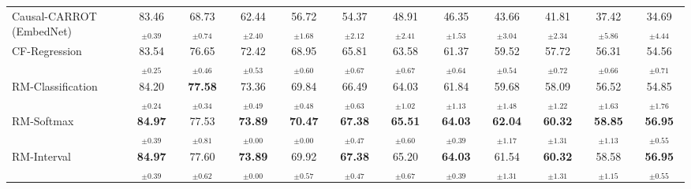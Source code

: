 \documentclass{article}
\theoremstyle{remark}
\begin{document}
\begin{table}[H]
{\begin{tabular}{lccccccccccc}
Causal-CARROT (EmbedNet) & 83.46$_{\pm0.39}$ & 68.73$_{\pm0.74}$ & 62.44$_{\pm2.40}$ & 56.72$_{\pm1.68}$ & 54.37$_{\pm2.12}$ & 48.91$_{\pm2.41}$ & 46.35$_{\pm1.53}$ & 43.66$_{\pm3.04}$ & 41.81$_{\pm2.34}$ & 37.42$_{\pm5.86}$ & 34.69$_{\pm4.44}$ \\
CF-Regression & 83.54$_{\pm0.25}$ & 76.65$_{\pm0.46}$ & 72.42$_{\pm0.53}$ & 68.95$_{\pm0.60}$ & 65.81$_{\pm0.67}$ & 63.58$_{\pm0.67}$ & 61.37$_{\pm0.64}$ & 59.52$_{\pm0.54}$ & 57.72$_{\pm0.72}$ & 56.31$_{\pm0.66}$ & 54.56$_{\pm0.71}$ \\
RM-Classification & 84.20$_{\pm0.24}$ & \textbf{77.58}$_{\pm0.34}$ & 73.36$_{\pm0.49}$ & 69.84$_{\pm0.48}$ & 66.49$_{\pm0.63}$ & 64.03$_{\pm1.02}$ & 61.84$_{\pm1.13}$ & 59.68$_{\pm1.48}$ & 58.09$_{\pm1.22}$ & 56.52$_{\pm1.63}$ & 54.85$_{\pm1.76}$ \\
RM-Softmax & \textbf{84.97}$_{\pm0.39}$ & 77.53$_{\pm0.81}$ & \textbf{73.89}$_{\pm0.00}$ & \textbf{70.47}$_{\pm0.00}$ & \textbf{67.38}$_{\pm0.47}$ & \textbf{65.51}$_{\pm0.60}$ & \textbf{64.03}$_{\pm0.39}$ & \textbf{62.04}$_{\pm1.17}$ & \textbf{60.32}$_{\pm1.31}$ & \textbf{58.85}$_{\pm1.13}$ & \textbf{56.95}$_{\pm0.55}$ \\ \hdashline
RM-Interval & \textbf{84.97}$_{\pm0.39}$ & 77.60$_{\pm0.62}$ & \textbf{73.89}$_{\pm0.00}$ & 69.92$_{\pm0.57}$ & \textbf{67.38}$_{\pm0.47}$ & 65.20$_{\pm0.67}$ & \textbf{64.03}$_{\pm0.39}$ & 61.54$_{\pm1.31}$ & \textbf{60.32}$_{\pm1.31}$ & 58.58$_{\pm1.15}$ & \textbf{56.95}$_{\pm0.55}$ \\
\bottomrule
\end{tabular}
}
\end{table}
\end{document}
